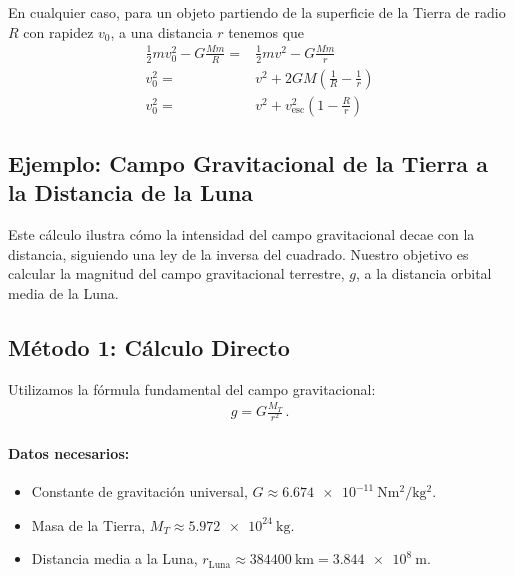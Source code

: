 \documentclass[11pt,a4paper]{book}
\begin{document}

En cualquier caso,  para un objeto partiendo de la superficie de la Tierra de radio $R$ con rapidez $v_0$,   a una distancia $r$ tenemos que
\begin{align*}
    \frac{1}{2}mv_0^2 -G\frac{Mm}{R} = &\frac{1}{2}mv^2 -G\frac{Mm}{r}\\
    v_0^2 =&v^2+2GM\left(\frac{1}{R}-\frac{1}{r}\right)\\
     v_0^2 =& v^2+v_{\text{esc}}^2\left(1-\frac{R}{r}\right)
\end{align*}

\subsection{Ejemplo: Campo Gravitacional de la Tierra a la Distancia de la Luna}

Este cálculo ilustra cómo la intensidad del campo gravitacional decae con la distancia, siguiendo una ley de la inversa del cuadrado. Nuestro objetivo es calcular la magnitud del campo gravitacional terrestre, $g$, a la distancia orbital media de la Luna.

\subsection*{Método 1: Cálculo Directo}
Utilizamos la fórmula fundamental del campo gravitacional:
\begin{align}
    \label{eq:GraviationalField}
    g = G \frac{M_T}{r^2}\,.
\end{align}

\paragraph{Datos necesarios:}
\begin{itemize}
    \item Constante de gravitación universal, $G \approx \SI{6.674e-11}{\newton\meter\squared\per\kilo\gram\squared}$.
    \item Masa de la Tierra, $M_T \approx \SI{5.972e24}{\kilo\gram}$.
    \item Distancia media a la Luna, $r_{\text{Luna}} \approx \SI{384400}{\kilo\meter} = \SI{3.844e8}{\meter}$.
\end{itemize}
\end{document}
